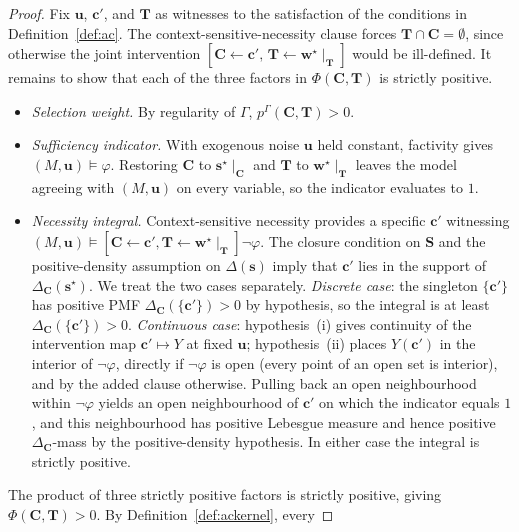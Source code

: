 \begin{proof}
Fix $\mathbf{u}$, $\mathbf{c}'$, and $\mathbf{T}$ as witnesses to the satisfaction of
the conditions in Definition~\ref{def:ac}. The context-sensitive-necessity clause
forces $\mathbf{T}\cap\mathbf{C}=\emptyset$, since otherwise the joint intervention
$[\mathbf{C}\!\leftarrow\!\mathbf{c}',\,\mathbf{T}\!\leftarrow\!\mathbf{w}^\star\!\mid_{\mathbf{T}}]$ would
be ill-defined. It remains to show that each of the three factors in
$\Phi(\mathbf{C},\mathbf{T})$ is strictly positive.
\begin{itemize}
\item \emph{Selection weight.} By regularity of $\Gamma$,
$p^\Gamma(\mathbf{C},\mathbf{T})>0$.
\item \emph{Sufficiency indicator.} With exogenous noise $\mathbf{u}$ held constant,
factivity gives $(M,\mathbf{u})\vDash\varphi$. Restoring $\mathbf{C}$ to
$\mathbf{s}^\star\!\mid_{\mathbf{C}}$ and $\mathbf{T}$ to $\mathbf{w}^\star\!\mid_{\mathbf{T}}$
leaves the model agreeing with $(M,\mathbf{u})$ on every variable, so the indicator
evaluates to $1$.
\item \emph{Necessity integral.} Context-sensitive necessity provides a specific
$\mathbf{c}'$ witnessing
$(M,\mathbf{u})\vDash[\mathbf{C}\!\leftarrow\!\mathbf{c}',\mathbf{T}\!\leftarrow\!\mathbf{w}^\star\!\mid_{\mathbf{T}}]\neg\varphi$.
The closure condition on $\mathbf{S}$ and the positive-density assumption on
$\Delta(\mathbf{s})$ imply that $\mathbf{c}'$ lies in the support of
$\Delta_{\mathbf{C}}(\mathbf{s}^\star)$. We treat the two cases separately.
\emph{Discrete case}: the singleton $\{\mathbf{c}'\}$ has positive PMF
$\Delta_{\mathbf{C}}(\{\mathbf{c}'\})>0$ by hypothesis, so the integral is at least
$\Delta_{\mathbf{C}}(\{\mathbf{c}'\})>0$. \emph{Continuous case}: hypothesis~(i) gives
continuity of the intervention map $\mathbf{c}'\mapsto Y$ at fixed $\mathbf{u}$;
hypothesis~(ii) places $Y(\mathbf{c}')$ in the interior of $\neg\varphi$, directly if $\neg\varphi$ is open (every point of an open set is interior), and by the added
clause otherwise. Pulling back
an open neighbourhood within $\neg\varphi$ yields an open neighbourhood of
$\mathbf{c}'$ on which the indicator equals $1$, and this neighbourhood has positive
Lebesgue measure and hence positive $\Delta_{\mathbf{C}}$-mass by the
positive-density hypothesis. In either case the integral is strictly positive.
\end{itemize}
The product of three strictly positive factors is strictly positive, giving
$\Phi(\mathbf{C},\mathbf{T})>0$. By Definition~\ref{def:ackernel}, every

\end{proof}
